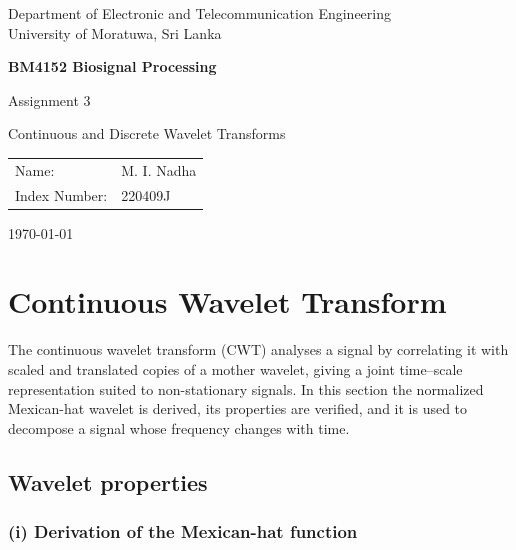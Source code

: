 \documentclass[11pt,a4paper]{article}
\begin{document}
\begin{titlepage}
    \centering
    \vspace*{3cm}
    {\large Department of Electronic and Telecommunication Engineering\\
    University of Moratuwa, Sri Lanka\par}
    \vspace{3cm}
    {\LARGE\bfseries BM4152 Biosignal Processing\par}
    \vspace{0.8cm}
    {\Large Assignment 3\par}
    \vspace{0.4cm}
    {\Large Continuous and Discrete Wavelet Transforms\par}
    \vspace{4cm}
    {\large
    \begin{tabular}{ll}
        Name:         & M. I. Nadha \\
        Index Number: & 220409J
    \end{tabular}\par}
    \vfill
    {\large \today\par}
\end{titlepage}

\tableofcontents
\newpage

\section{Continuous Wavelet Transform}

The continuous wavelet transform (CWT) analyses a signal by correlating it with scaled and translated copies of a mother wavelet, giving a joint time--scale representation suited to non-stationary signals. In this section the normalized Mexican-hat wavelet is derived, its properties are verified, and it is used to decompose a signal whose frequency changes with time.

\subsection{Wavelet properties}

\subsubsection*{(i) Derivation of the Mexican-hat function}
\end{document}
